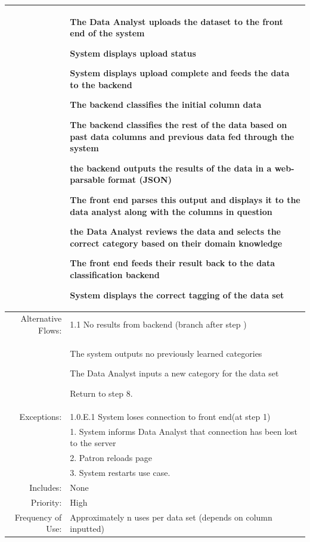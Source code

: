 \documentclass[12pt,oneside,letterpaper]{article}
\newenvironment{packed_enumerate}{ %
\vspace{-7mm}
\begin{enumerate}
  \setlength{\itemsep}{0pt}
  \setlength{\parskip}{0pt}
  \setlength{\parsep}{0pt}
}{\end{enumerate}
\vspace{-8mm}}
\begin{document}
\begin{longtable}{|r|p{3.8in}|}
&  %
\begin{packed_enumerate}
\item The Data Analyst uploads the dataset to the front end of the system
\item System displays upload status
\item System displays upload complete and feeds the data to the backend
\item The backend classifies the initial column data
\item The backend classifies the rest of the data based on past data columns and previous data fed through the system
\item the backend outputs the results of the data in a web-parsable format (JSON)
\item The front end parses this output and displays it to the data analyst along with the columns in question
\item the Data Analyst reviews the data and selects the correct category based on their domain knowledge
\item The front end feeds their result back to the data classification backend
\item System displays the correct tagging of the data set
\end{packed_enumerate}\\
\hline
Alternative Flows:&1.1 No results from backend (branch after step )\\
&  %
\begin{packed_enumerate}
\item The system outputs no previously learned categories
\item The Data Analyst inputs a new category for the data set
\item Return to step 8.
\end{packed_enumerate}\\
\hline
Exceptions:&1.0.E.1 System loses connection to front end(at step 1)\\
&1. 	System informs Data Analyst that connection has been lost to the server\\
&2.	Patron reloads page\\
&3.	System restarts use case.\\
\hline
Includes:&None\\
\hline
Priority:&High\\
\hline
Frequency of Use:&Approximately n uses per data set (depends on column inputted)\\

\end{longtable}
\end{document}

